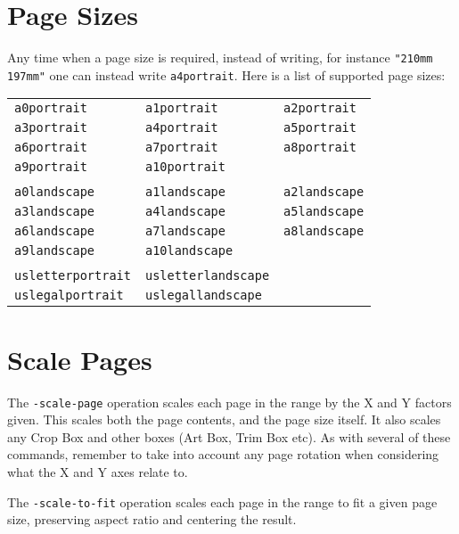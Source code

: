\documentclass{book}
\newcommand{\smallgap}{\bigskip}
\begin{document}
  \section{Page Sizes}
  Any time when a page size is required, instead of writing, for instance \texttt{"210mm 197mm"} one can instead write \texttt{a4portrait}. Here is a list of supported page sizes:

{\small
  \smallgap
  \begin{tabular}{lll}
  \texttt{a0portrait} & \texttt{a1portrait} & \texttt{a2portrait} \\
  \texttt{a3portrait} & \texttt{a4portrait} & \texttt{a5portrait} \\
  \texttt{a6portrait} & \texttt{a7portrait} & \texttt{a8portrait} \\
  \texttt{a9portrait} & \texttt{a10portrait} & \\
  \\
  \texttt{a0landscape} & \texttt{a1landscape} & \texttt{a2landscape} \\
  \texttt{a3landscape} & \texttt{a4landscape} & \texttt{a5landscape} \\
  \texttt{a6landscape} & \texttt{a7landscape} & \texttt{a8landscape} \\
  \texttt{a9landscape} & \texttt{a10landscape} & \\
  \\
  \texttt{usletterportrait} & \texttt{usletterlandscape} & \\
  \texttt{uslegalportrait} & \texttt{uslegallandscape} &
  \end{tabular}
}
  \section{Scale Pages}
  The \texttt{-scale-page} operation scales each page in the range by the X and
Y factors given. This scales both the page contents, and the page size itself. It also scales any Crop Box and other boxes (Art Box, Trim Box etc). As with several of these commands, remember to take into account any page rotation when considering what the X and Y axes relate to.

\noindent{}


  \noindent The \texttt{-scale-to-fit} operation scales each page in the range to fit a
  given page size, preserving aspect ratio and centering the result.
\end{document}
